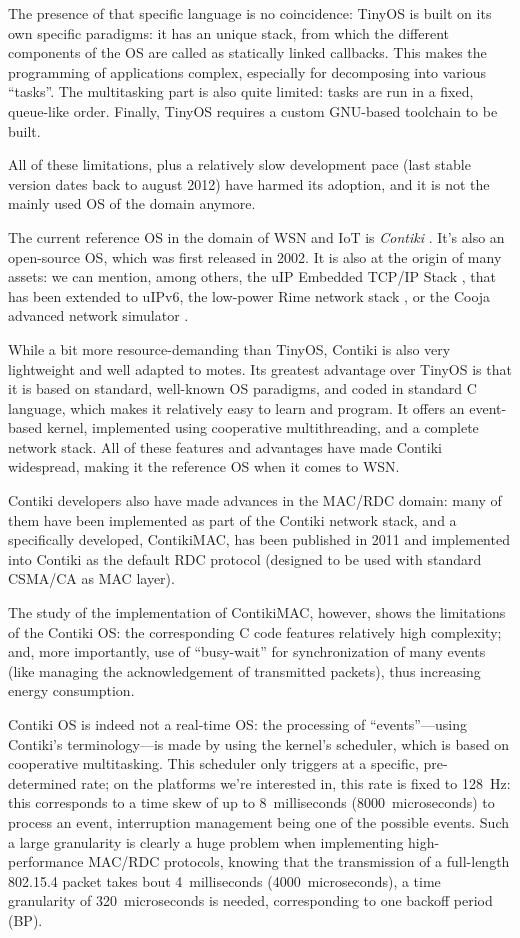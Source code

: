 \documentclass[a4paper,twoside]{article}
\begin{document}
The presence of that specific language is no coincidence: TinyOS is built
on its own specific paradigms: it has an unique stack, from which the
different components of the OS are called as statically linked callbacks.
This makes the programming of applications complex, especially for
decomposing into various ``tasks''. The multitasking part is also
quite limited: tasks are run in a fixed, queue-like order. Finally,
TinyOS requires a custom GNU-based toolchain to be built.

All of these limitations, plus a relatively slow development pace (last
stable version dates back to august 2012) have harmed its adoption,
and it is not the mainly used OS of the domain anymore.


The current reference OS in the domain of WSN and IoT is \emph{Contiki}
\cite{ContikiOS}. It's also an open-source OS, which was first released
in 2002. It is also at the origin of many assets: we can mention, among
others, the uIP Embedded TCP/IP Stack \cite{uip}, that has been extended
to uIPv6, the low-power Rime network stack \cite{Rime}, or the Cooja advanced
network simulator \cite{Cooja}.

While a bit more resource-demanding than TinyOS, Contiki is also very
lightweight and well adapted to motes. Its greatest advantage over TinyOS
is that it is based on standard, well-known OS paradigms, and coded
in standard C language, which makes it relatively easy to learn and program.
It offers an event-based kernel, implemented using cooperative multithreading,
and a complete network stack. All of these features and advantages have made
Contiki widespread, making it the reference OS when it comes to WSN.

Contiki developers also have made advances in the MAC/RDC domain: many
of them have been implemented as part of the Contiki network stack, and
a specifically developed, ContikiMAC, has been published in 2011
\cite{ContikiMAC} and implemented into Contiki as the default
RDC protocol (designed to be used with standard CSMA/CA as MAC layer).

The study of the implementation of ContikiMAC, however, shows
the limitations of the Contiki OS: the corresponding C code features
relatively high complexity; and, more importantly, use of ``busy-wait''
for synchronization of many events (like managing the acknowledgement
of transmitted packets), thus increasing energy consumption.

Contiki OS is indeed not a real-time OS: the processing of ``events''---using
Contiki's terminology---is made by using the kernel's scheduler, which is
based on cooperative multitasking. This scheduler only triggers at a specific,
pre-determined rate; on the platforms we're interested in, this rate is
fixed to 128~Hz: this corresponds to a time skew of up to 8~milliseconds
(8000~microseconds) to process an event, interruption management being
one of the possible events. Such a large granularity is clearly
a huge problem when implementing high-performance MAC/RDC protocols,
knowing that the transmission of a full-length 802.15.4 packet takes
bout 4~milliseconds (4000~microseconds), a time granularity of
320~microseconds is needed, corresponding to one backoff period (BP).
\end{document}
